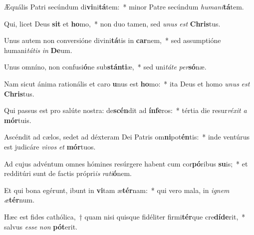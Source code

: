 \item Æquális Patri secúndum di\textbf{vi}ni\textbf{tá}tem:~* minor Patre secúndum \textit{hu}\textit{ma}\textit{ni}\textbf{tá}tem.
\item Qui, licet Deus \textbf{sit} et \textbf{ho}mo,~* non duo tamen, sed \textit{u}\textit{nus} \textit{est} \textbf{Chris}tus.
\item Unus autem non conversióne divini\textbf{tá}tis in \textbf{car}nem,~* sed assumptióne humani\textit{tá}\textit{tis} \textit{in} \textbf{De}um.
\item Unus omníno, non confusi\textbf{ó}ne sub\textbf{stán}\textbf{ti}æ,~* sed uni\textit{tá}\textit{te} \textit{per}\textbf{só}næ.
\item Nam sicut ánima rationális et caro \textbf{u}nus est \textbf{ho}mo:~* ita Deus et homo \textit{u}\textit{nus} \textit{est} \textbf{Chris}tus.
\item Qui passus est pro salúte nostra: de\textbf{scén}dit ad \textbf{ín}\textbf{fe}ros:~* tértia die resur\textit{ré}\textit{xit} \textit{a} \textbf{mór}tuis.
\item Ascéndit ad cælos, sedet ad déxteram Dei Patris om\textbf{ni}pot\textbf{én}tis:~* inde ventúrus est judicáre \textit{vi}\textit{vos} \textit{et} \textbf{mór}tuos.
\item Ad cujus advéntum omnes hómines resúrgere habent cum cor\textbf{pó}ribus \textbf{su}is;~* et redditúri sunt de factis própri\textit{is} \textit{ra}\textit{ti}\textbf{ó}nem.
\item Et qui bona egérunt, ibunt in \textbf{vi}tam æ\textbf{tér}nam:~* qui vero mala, in \textit{i}\textit{gnem} \textit{æ}\textbf{tér}num.
\item Hæc est fides cathólica,~† quam nisi quisque fidéliter firmi\textbf{tér}que cre\textbf{dí}\textbf{de}rit,~* salvus \textit{es}\textit{se} \textit{non} \textbf{pót}erit.
